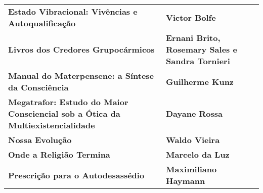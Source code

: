 \begin{longtable}[]{@{}
  >{\raggedright\arraybackslash}p{}
  >{\raggedright\arraybackslash}p{}@{}}
\begin{minipage}[b]{\linewidth}
\textbf{Estado Vibracional: Vivências e Autoqualificação}
\end{minipage} & \begin{minipage}[b]{\linewidth}\raggedright
\textbf{Victor Bolfe}
\end{minipage} \\
\begin{minipage}[b]{\linewidth}\raggedright
\textbf{Livros dos Credores Grupocármicos}
\end{minipage} & \begin{minipage}[b]{\linewidth}\raggedright
\textbf{Ernani Brito, Rosemary Sales e Sandra Tornieri}
\end{minipage} \\
\begin{minipage}[b]{\linewidth}\raggedright
\textbf{Manual do Materpensene: a Síntese da Consciência}
\end{minipage} & \begin{minipage}[b]{\linewidth}\raggedright
\textbf{Guilherme Kunz}
\end{minipage} \\
\begin{minipage}[b]{\linewidth}\raggedright
\textbf{Megatrafor: Estudo do Maior Consciencial sob a Ótica da Multiexistencialidade}
\end{minipage} & \begin{minipage}[b]{\linewidth}\raggedright
\textbf{Dayane Rossa}
\end{minipage} \\
\begin{minipage}[b]{\linewidth}\raggedright
\textbf{Nossa Evolução}
\end{minipage} & \begin{minipage}[b]{\linewidth}\raggedright
\textbf{Waldo Vieira}
\end{minipage} \\
\begin{minipage}[b]{\linewidth}\raggedright
\textbf{Onde a Religião Termina}
\end{minipage} & \begin{minipage}[b]{\linewidth}\raggedright
\textbf{Marcelo da Luz}
\end{minipage} \\
\begin{minipage}[b]{\linewidth}\raggedright
\textbf{Prescrição para o Autodesassédio}
\end{minipage} & \begin{minipage}[b]{\linewidth}\raggedright
\textbf{Maximiliano Haymann}

\end{minipage}
\end{longtable}
